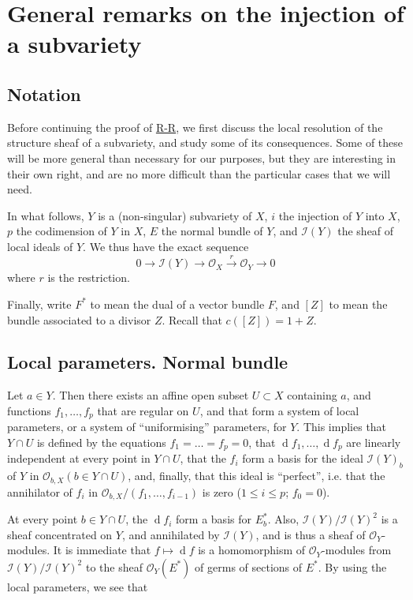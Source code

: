 \documentclass{article}
\theoremstyle{plain}
\theoremstyle{definition}
\newcommand{\scr}[1]{{\mathscr{#1}}}
\newcommand{\dd}{\operatorname{d}\!}
\renewcommand{\leq}{\leqslant}
\newcommand{\oldpage}[1]{\marginpar{\footnotesize$\Big\vert$ \textit{p.~#1}}}
\begin{document}
\section{General remarks on the injection of a subvariety}
\label{section10}


\subsection{Notation}
\label{subsection10a}

\oldpage{120}
Before continuing the proof of \hyperref[theoremriemannroch]{R-R}, we first discuss the local resolution of the structure sheaf of a subvariety, and study some of its consequences.
Some of these will be more general than necessary for our purposes, but they are interesting in their own right, and are no more difficult than the particular cases that we will need.

In what follows, $Y$ is a (non-singular) subvariety of $X$, $i$ the injection of $Y$ into $X$, $p$ the codimension of $Y$ in $X$, $E$ the normal bundle of $Y$, and $\scr{I}(Y)$ the sheaf of local ideals of $Y$.
We thus have the exact sequence
\[
\label{section10aequation1}
  0 \to \scr{I}(Y) \to \scr{O}_X \xrightarrow{r} \scr{O}_Y \to 0
  \tag{1}
\]
where $r$ is the restriction.

Finally, write $F^*$ to mean the dual of a vector bundle $F$, and $[Z]$ to mean the bundle associated to a divisor $Z$.
Recall that $c([Z])=1+Z$.


\subsection{Local parameters. Normal bundle}
\label{subsection10b}

Let $a\in Y$.
Then there exists an affine open subset $U\subset X$ containing $a$, and functions $f_1,\ldots,f_p$ that are regular on $U$, and that form a system of local parameters, or a system of ``uniformising'' parameters, for $Y$.
This implies that $Y\cap U$ is defined by the equations $f_1=\ldots=f_p=0$, that $\dd f_1,\ldots,\dd f_p$ are linearly independent at every point in $Y\cap U$, that the $f_i$ form a basis for the ideal $\scr{I}(Y)_b$ of $Y$ in $\scr{O}_{b,X}(b\in Y\cap U)$, and, finally, that this ideal is ``perfect'', i.e. that the annihilator of $f_i$ in $\scr{O}_{b,X}/(f_1,\ldots,f_{i-1})$ is zero ($1\leq i\leq p$; $f_0=0$).

At every point $b\in Y\cap U$, the $\dd f_i$ form a basis for $E_b^*$.
Also, $\scr{I}(Y)/\scr{I}(Y)^2$ is a sheaf concentrated on $Y$, and annihilated by $\scr{I}(Y)$, and is thus a sheaf of $\scr{O}_Y$-modules.
It is immediate that $f\mapsto\dd f$ is a homomorphism of $\scr{O}_Y$-modules from $\scr{I}(Y)/\scr{I}(Y)^2$ to the sheaf $\scr{O}_Y(E^*)$ of germs of sections of $E^*$.
By using the local parameters, we see that
\end{document}
